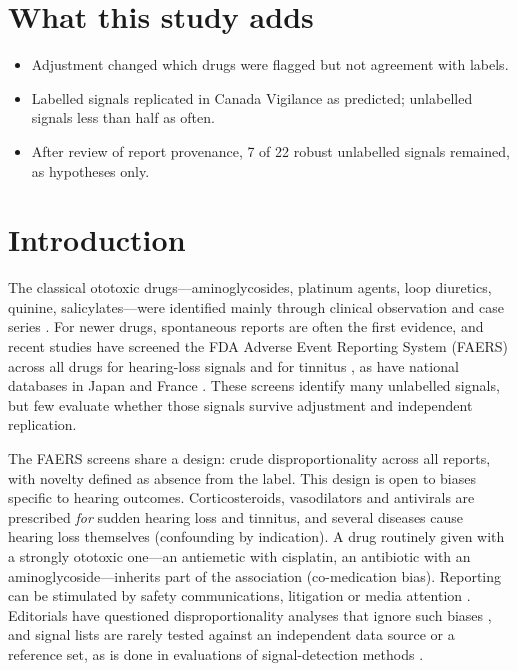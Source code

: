 \documentclass[11pt]{article}
\begin{document}
\section*{What this study adds}
\begin{itemize}
\item Adjustment changed which drugs were flagged but not agreement with labels.
\item Labelled signals replicated in Canada Vigilance as predicted; unlabelled signals less than half as often.
\item After review of report provenance, 7 of 22 robust unlabelled signals remained, as hypotheses only.
\end{itemize}

\section{Introduction}
The classical ototoxic drugs---aminoglycosides, platinum agents, loop diuretics, quinine, salicylates---were identified
mainly through clinical observation and case series \cite{lanvers2017}. For newer drugs, spontaneous reports are often the
first evidence, and recent studies have screened the FDA Adverse Event Reporting System (FAERS) across all drugs for
hearing-loss signals \cite{li2024,wu2025,liu2025} and for tinnitus \cite{narasimhaswamy2026,wang2024}, as have national
databases in Japan and France \cite{tanaka2019,favreliere2020}. These screens identify many unlabelled signals, but few
evaluate whether those signals survive adjustment and independent replication.

The FAERS screens share a design: crude disproportionality across all reports, with novelty defined as absence from the
label. This design is open to biases specific to hearing outcomes. Corticosteroids, vasodilators and antivirals are
prescribed \emph{for} sudden hearing loss and tinnitus, and several diseases cause hearing loss themselves (confounding by
indication). A drug routinely given with a strongly ototoxic one---an antiemetic with cisplatin, an antibiotic with an
aminoglycoside---inherits part of the association (co-medication bias). Reporting can be stimulated by safety
communications, litigation or media attention \cite{pariente2007}. Editorials have questioned disproportionality analyses
that ignore such biases \cite{ramessur2025}, and signal lists are rarely tested against an independent data source or a
reference set, as is done in evaluations of signal-detection methods \cite{harpaz2013}.
\end{document}
